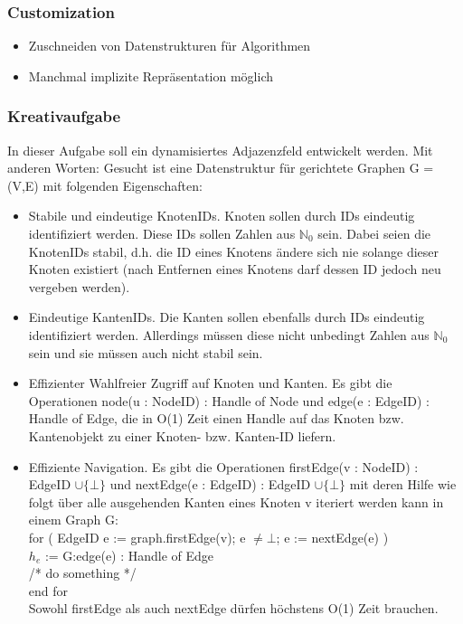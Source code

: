 \begin{frame}
\frametitle{Customization}
\begin{itemize}
\item Zuschneiden von Datenstrukturen für Algorithmen
\item Manchmal implizite Repräsentation möglich
\end{itemize}
\end{frame}

\begin{frame}
\frametitle{Kreativaufgabe}
In dieser Aufgabe soll ein dynamisiertes Adjazenzfeld entwickelt werden. Mit anderen Worten:
Gesucht ist eine Datenstruktur für gerichtete Graphen G = (V,E) mit folgenden Eigenschaften:
\begin{itemize}
\item Stabile und eindeutige KnotenIDs. Knoten sollen durch IDs eindeutig identifiziert werden.
Diese IDs sollen Zahlen aus $\mathbb{N}_0$ sein. Dabei seien die KnotenIDs stabil, d.h. die ID eines
Knotens ändere sich nie solange dieser Knoten existiert (nach Entfernen eines Knotens darf
dessen ID jedoch neu vergeben werden).
\item Eindeutige KantenIDs. Die Kanten sollen ebenfalls durch IDs eindeutig identifiziert werden.
Allerdings müssen diese nicht unbedingt Zahlen aus $\mathbb{N}_0$ sein und sie müssen auch
nicht stabil sein.
\item Effizienter Wahlfreier Zugriff auf Knoten und Kanten. Es gibt die Operationen
 node(u : NodeID) : Handle of Node und
 edge(e : EdgeID) : Handle of Edge,
die in O(1) Zeit einen Handle auf das Knoten bzw. Kantenobjekt zu einer Knoten- bzw.
Kanten-ID liefern.
\end{itemize}
\end{frame}

\begin{frame}
\begin{itemize}
\item Effiziente Navigation. Es gibt die Operationen
 firstEdge(v : NodeID) : EdgeID $\cup \{\bot\}$ und
 nextEdge(e : EdgeID) : EdgeID $\cup \{\bot\}$
mit deren Hilfe wie folgt über alle ausgehenden Kanten eines Knoten v iteriert werden
kann in einem Graph G:\\
for ( EdgeID e := graph.firstEdge(v); e $\neq\bot$; e := nextEdge(e) )\\
$h_e$ := G:edge(e) : Handle of Edge\\
/* do something */\\
end for\\
Sowohl firstEdge als auch nextEdge dürfen höchstens O(1) Zeit brauchen.
\end{itemize}
\end{frame}

